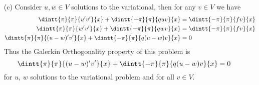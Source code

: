 \documentclass[11pt, oneside]{article}
\begin{document}
\begin{enumerate}
\begin{proof}
        Now let $u$ be a solution to the energy minimization problem, then 
        \[
          F(u) \le F(w)
        \]
        for all $w \in V$.
        Let $v \in V$ and consider $w = u + \varepsilon v$, then
        $F(u) \le F(u + \varepsilon v)$.
        Consider the function of $\varepsilon$,
        \[
          g(\varepsilon) = F(u + \varepsilon v)
        \]
        we know that $g$ has a minimum at $\varepsilon = 0$ thus $g'(0) = 0$.
        \begin{align*}
          g(\varepsilon) &= \frac{1}{2}\p{\dintt{\pi}{\pi}{(u'+\varepsilon v')^2}{x} + \dintt{-\pi}{\pi}{q(u+\varepsilon v)^2}{x}} - \dintt{-\pi}{\pi}{f(u+\varepsilon v)}{x} \\
          &= \frac{1}{2}\p{\dintt{\pi}{\pi}{(u')^2}{x} + \dintt{-\pi}{\pi}{qu^2}{x}} - \dintt{-\pi}{\pi}{fu}{x} + \varepsilon\dintt{-\pi}{\pi}{u'v'}{x} + \varepsilon\dintt{-\pi}{\pi}{quv}{x} - \varepsilon\dintt{-\pi}{\pi}{fv}{x} + \varepsilon^2\dintt{-\pi}{\pi}{(v')^2 + qv^2}{x} \\
          g'(\varepsilon) &= \dintt{-\pi}{\pi}{u'v'}{x} + \dintt{-\pi}{\pi}{quv}{x} - \dintt{-\pi}{\pi}{fv}{x} + 2\varepsilon\dintt{-\pi}{\pi}{(v')^2 + qv^2}{x} \\
          g'(0) &= \dintt{-\pi}{\pi}{u'v'}{x} + \dintt{-\pi}{\pi}{quv}{x} - \dintt{-\pi}{\pi}{fv}{x} \\
          0 &= \dintt{-\pi}{\pi}{u'v'}{x} + \dintt{-\pi}{\pi}{quv}{x} - \dintt{-\pi}{\pi}{fv}{x} \\
          \dintt{-\pi}{\pi}{fv}{x} &= \dintt{-\pi}{\pi}{u'v'}{x} + \dintt{-\pi}{\pi}{quv}{x} \\
        \end{align*}
        Since this is true for any $v \in V$, this shows that $u$ is a solution
        to the variational problem.
      \end{proof}

    \item[(c)] %
      Consider $u, w \in V$ solutions to the variational, then for any $v \in V$
      we have
      \begin{align*}
        \dintt{\pi}{\pi}{u'v'}{x} + \dintt{-\pi}{\pi}{quv}{x} &= \dintt{-\pi}{\pi}{fv}{x} \\
        \dintt{\pi}{\pi}{w'v'}{x} + \dintt{-\pi}{\pi}{qwv}{x} &= \dintt{-\pi}{\pi}{fv}{x} \\
        \dintt{\pi}{\pi}{(u - w)'v'}{x} + \dintt{-\pi}{\pi}{q(u - w)v}{x} &= 0
      \end{align*}
      Thus the Galerkin Orthogonality property of this problem is
      \[
        \dintt{\pi}{\pi}{(u - w)'v'}{x} + \dintt{-\pi}{\pi}{q(u - w)v}{x} = 0
      \]
      for $u$, $w$ solutions to the variational problem and for all $v \in V$.


\end{enumerate}
\end{document}
